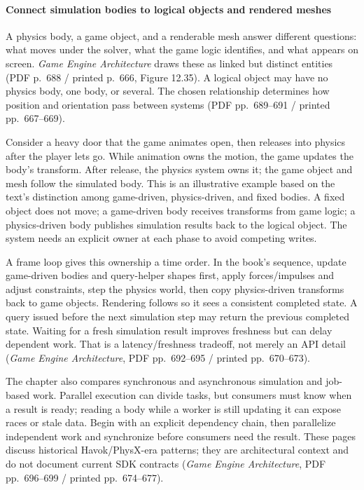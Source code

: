 \paragraph{Connect simulation bodies to logical objects and rendered meshes}\label{06-engine-ii-ch033-connect-simulation-bodies-to-logical-objects-and-rendered-meshes}

A physics body, a game object, and a renderable mesh answer different questions: what moves under the solver, what the game logic identifies, and what appears on screen. \emph{Game Engine Architecture} draws these as linked but distinct entities (PDF p.~688 / printed p.~666, Figure 12.35). A logical object may have no physics body, one body, or several. The chosen relationship determines how position and orientation pass between systems (PDF pp.~689--691 / printed pp.~667--669).

Consider a heavy door that the game animates open, then releases into physics after the player lets go. While animation owns the motion, the game updates the body's transform. After release, the physics system owns it; the game object and mesh follow the simulated body. This is an illustrative example based on the text's distinction among game-driven, physics-driven, and fixed bodies. A fixed object does not move; a game-driven body receives transforms from game logic; a physics-driven body publishes simulation results back to the logical object. The system needs an explicit owner at each phase to avoid competing writes.

A frame loop gives this ownership a time order. In the book's sequence, update game-driven bodies and query-helper shapes first, apply forces/impulses and adjust constraints, step the physics world, then copy physics-driven transforms back to game objects. Rendering follows so it sees a consistent completed state. A query issued before the next simulation step may return the previous completed state. Waiting for a fresh simulation result improves freshness but can delay dependent work. That is a latency/freshness tradeoff, not merely an API detail (\emph{Game Engine Architecture}, PDF pp.~692--695 / printed pp.~670--673).

The chapter also compares synchronous and asynchronous simulation and job-based work. Parallel execution can divide tasks, but consumers must know when a result is ready; reading a body while a worker is still updating it can expose races or stale data. Begin with an explicit dependency chain, then parallelize independent work and synchronize before consumers need the result. These pages discuss historical Havok/PhysX-era patterns; they are architectural context and do not document current SDK contracts (\emph{Game Engine Architecture}, PDF pp.~696--699 / printed pp.~674--677).

